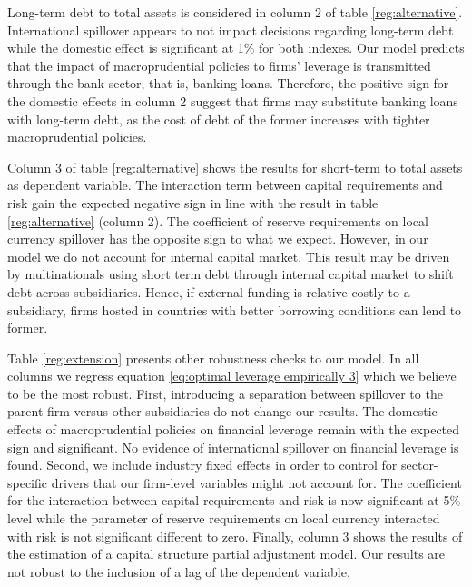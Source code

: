 \documentclass[12pt]{article}
\begin{document}
	Long-term debt to total assets is considered in column 2 of table \ref{reg:alternative}. International spillover appears to not impact decisions regarding long-term debt while the domestic effect is significant at 1\% for both indexes. Our model predicts that the impact of macroprudential policies to firms' leverage is transmitted through the bank sector, that is, banking loans. Therefore, the positive sign for the domestic effects in column 2 suggest that firms may substitute banking loans with long-term debt, as the cost of debt of the former increases with tighter macroprudential policies. 
	
	\begin{small}
	{
		
	}
\end{small}

Column 3 of table \ref{reg:alternative} shows the results for short-term to total assets as dependent variable. The interaction term between capital requirements and risk gain the expected negative sign in line with the result in table \ref{reg:alternative} (column 2). The coefficient of reserve requirements on local currency spillover has the opposite sign to what we expect. However, in our model we do not account for internal capital market. This result may be driven by multinationals using short term debt through internal capital market to shift debt across subsidiaries. Hence, if external funding is relative costly to a subsidiary, firms hosted in countries with better borrowing conditions can lend to former. 

Table \ref{reg:extension} presents other robustness checks to our model. In all columns we regress equation \ref{eq:optimal leverage empirically 3} which we believe to be the most robust. First, introducing a separation between spillover to the parent firm versus other subsidiaries do not change our results. The domestic effects of macroprudential policies on financial leverage remain with the expected sign and significant. No evidence of international spillover on financial leverage is found. Second, we include industry fixed effects in order to control for sector-specific drivers that our firm-level variables might not account for. The coefficient for the interaction between capital requirements and risk is now significant at 5\% level while the parameter of reserve requirements on local currency interacted with risk is not significant different to zero. Finally,  column 3 shows the results of the estimation of a capital structure partial adjustment model. Our results are not robust to the inclusion of a lag of the dependent variable. 
\end{document}
